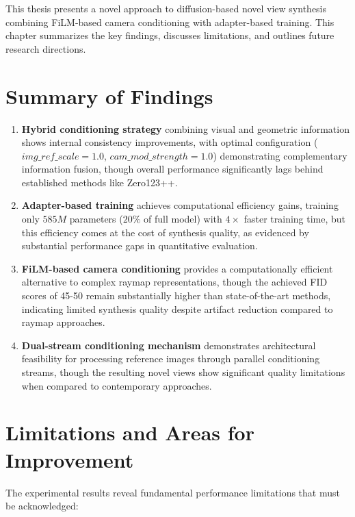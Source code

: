 \label{chapter:conclusions}

This thesis presents a novel approach to diffusion-based novel view synthesis combining FiLM-based camera conditioning with adapter-based training. This chapter summarizes the key findings, discusses limitations, and outlines future research directions.

\section{Summary of Findings}

\begin{enumerate}
  \item \textbf{Hybrid conditioning strategy} combining visual and geometric information shows internal consistency improvements, with optimal configuration ($img\_ref\_scale=1.0$, $cam\_mod\_strength=1.0$) demonstrating complementary information fusion, though overall performance significantly lags behind established methods like Zero123++.

  \item \textbf{Adapter-based training} achieves computational efficiency gains, training only $585M$ parameters ($20\%$ of full model) with $4\times$ faster training time, but this efficiency comes at the cost of synthesis quality, as evidenced by substantial performance gaps in quantitative evaluation.

  \item \textbf{FiLM-based camera conditioning} provides a computationally efficient alternative to complex raymap representations, though the achieved FID scores of 45-50 remain substantially higher than state-of-the-art methods, indicating limited synthesis quality despite artifact reduction compared to raymap approaches.

  \item \textbf{Dual-stream conditioning mechanism} demonstrates architectural feasibility for processing reference images through parallel conditioning streams, though the resulting novel views show significant quality limitations when compared to contemporary approaches.
\end{enumerate}

\section{Limitations and Areas for Improvement}

The experimental results reveal fundamental performance limitations that must be acknowledged:

